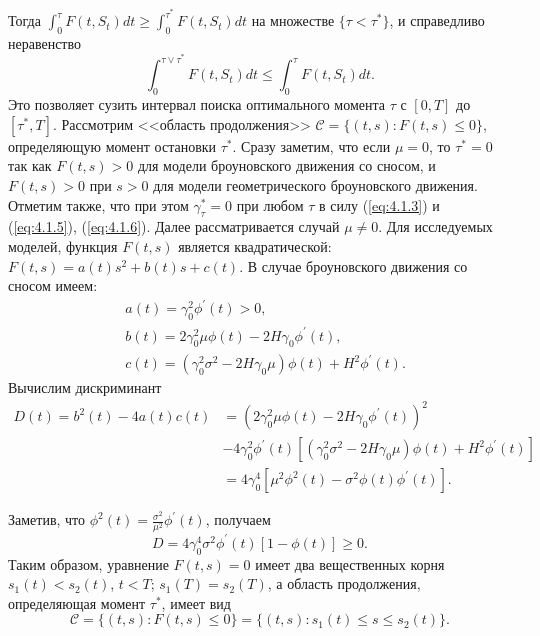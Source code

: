Тогда $\int^{\tau}_0 F(t,S_t)dt \ge \int^{\tau^*}_0 F(t,S_t)dt$  на множестве $\{\tau < \tau^*\}$, и справедливо неравенство
\begin{equation*}
 \label{eq:4.2.3}
\int^{\tau \vee \tau^*}_0 F(t,S_t)dt \le \int^{\tau}_0 F(t,S_t)dt.
\end{equation*}
Это позволяет сузить интервал поиска оптимального момента $\tau$ с $[0,T]$ до $[\tau^*,T]$.
Рассмотрим <<область продолжения>>  $\mathcal C=\{(t,s): F(t,s) \le 0\}$, определяющую момент остановки $\tau^*$. Сразу заметим, что если $\mu=0$, то $\tau^*=0$ так как $F(t,s) > 0$ для модели броуновского движения со сносом, и $F(t,s) > 0$ при $s>0$ для модели геометрического броуновского движения. Отметим также, что при этом $\gamma^*_\tau=0$ при любом $\tau$ в силу (\ref{eq:4.1.3}) и (\ref{eq:4.1.5}), (\ref{eq:4.1.6}). Далее рассматривается случай $\mu \neq 0$.
Для исследуемых моделей, функция $F(t,s)$ является квадратической: $F(t,s)=a(t)s^2+b(t)s+c(t)$. В случае броуновского движения со сносом имеем:
\begin{align*}
&a(t)=\gamma_0^2 \phi^\prime(t) > 0,\\
&b(t)=2\gamma_0^2\mu \phi(t)-2H\gamma_0 \phi^\prime(t),\\
&c(t)=(\gamma_0^2 \sigma^2-2H \gamma_0 \mu) \phi(t)+H^2 \phi^\prime(t).
\end{align*}
Вычислим дискриминант
\begin{align*}
D(t)= b^2(t)-4a(t)c(t)&=(2\gamma_0^2\mu \phi(t)-2H\gamma_0 \phi^\prime(t))^2\\
&-4 \gamma_0^2 \phi^\prime(t) [(\gamma_0^2 \sigma^2-2H \gamma_0 \mu) \phi(t)+H^2 \phi^\prime(t)]\\
&=4\gamma_0^4[\mu^2\phi^2(t)-\sigma^2\phi(t)\phi^\prime(t)].
\end{align*}

Заметив, что $\phi^2(t)=\frac{\sigma^2}{\mu^2}\phi^\prime(t)$, получаем
$$D=4\gamma_0^4\sigma^2 \phi^\prime(t) [1-\phi(t)] \ge 0.$$
Таким образом, уравнение $F(t,s)=0$ имеет два вещественных корня $s_1(t)<s_2(t)$, $t<T$; $s_1(T)=s_2(T)$, а область продолжения, определяющая момент $\tau^*$, имеет вид
$$\mathcal C=\{(t,s): F(t,s) \le 0\}=\{(t,s): s_1(t) \le s \le s_2(t)\}.$$

